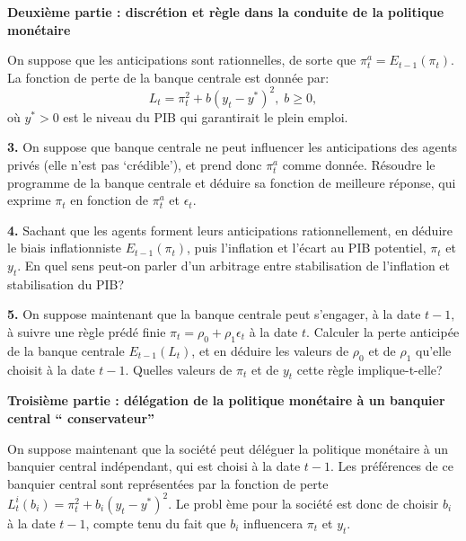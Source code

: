 \documentclass[11pt,a4paper]{article}
\begin{document}
\bigskip

\noindent \textbf{Deuxi\`{e}me partie : discr\'{e}tion et r\`{e}gle dans la
conduite de la politique mon\'{e}taire}

On suppose que les anticipations sont rationnelles, de sorte que $\pi
_{t}^{a}=E_{t-1}\left( \pi _{t}\right) $. La fonction de perte de la banque
centrale est donn\'{e}e par:%
\begin{equation*}
L_{t}=\pi _{t}^{2}+b\left( y_{t}-y^{\ast }\right) ^{2},\;b\geq 0,
\end{equation*}%
o\`{u} $y^{\ast }>0$ est le niveau du PIB qui garantirait le plein emploi.

\noindent \textbf{3.} On suppose que banque centrale ne peut influencer les
anticipations des agents priv\'{e}s (elle n'est pas `cr\'{e}dible'), et
prend donc $\pi _{t}^{a}$ comme donn\'{e}e. R\'{e}soudre le programme de la
banque centrale et d\'{e}duire sa fonction de meilleure r\'{e}ponse, qui
exprime $\pi _{t}$ en fonction de $\pi _{t}^{a}$ et $\epsilon _{t}$.

\noindent \textbf{4.} Sachant que les agents forment leurs anticipations
rationnellement, en d\'{e}duire le biais inflationniste $E_{t-1}\left( \pi
_{t}\right) $, puis l'inflation et l'\'{e}cart au PIB potentiel, $\pi _{t}$
et $y_{t}$. En quel sens peut-on parler d'un arbitrage entre stabilisation
de l'inflation et stabilisation du PIB?

\noindent \textbf{5.} On suppose maintenant que la banque centrale peut
s'engager, \`{a} la date $t-1,$ \`{a} suivre une r\`{e}gle pr\'{e}d\'{e}%
finie $\pi _{t}=\rho _{0}+\rho _{1}\epsilon _{t}$ \`{a} la date $t$.
Calculer la perte anticip\'{e}e de la banque centrale $E_{t-1}\left(
L_{t}\right) $, et en d\'{e}duire les valeurs de $\rho _{0}$ et de $\rho
_{1} $ qu'elle choisit \`{a} la date $t-1$. Quelles valeurs de $\pi _{t}$ et
de $y_{t}$ cette r\`{e}gle implique-t-elle?

\bigskip

\noindent \textbf{Troisi\`{e}me partie : d\'{e}l\'{e}gation de la politique
mon\'{e}taire \`{a} un banquier central \textquotedblleft
conservateur\textquotedblright }

\bigskip

On suppose maintenant que la soci\'{e}t\'{e} peut d\'{e}l\'{e}guer la
politique mon\'{e}taire \`{a} un banquier central ind\'{e}pendant, qui est
choisi \`{a} la date $t-1$. Les pr\'{e}f\'{e}rences de ce banquier central
sont repr\'{e}sent\'{e}es par la fonction de perte $L_{t}^{i}\left(
b_{i}\right) =\pi _{t}^{2}+b_{i}\left( y_{t}-y^{\ast }\right) ^{2}.$ Le probl%
\`{e}me pour la soci\'{e}t\'{e} est donc de choisir $b_{i}$ \`{a} la date $%
t-1$, compte tenu du fait que $b_{i}$ influencera $\pi _{t}$ et $y_{t}$.
\end{document}
